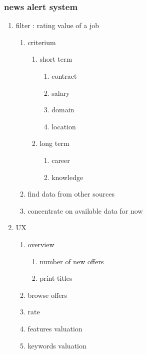 \documentclass[11pt]{article}
\begin{document}
\subsubsection{news alert system}
\label{sec:org2300e3e}
\begin{enumerate}
\item filter : rating value of a job
\label{sec:org435fa25}
\begin{enumerate}
\item criterium
\label{sec:orgd6d5d5d}
\begin{enumerate}
\item short term
\label{sec:org4d99756}
\begin{enumerate}
\item contract
\label{sec:org21076ce}
\item salary
\label{sec:org995e610}
\item domain
\label{sec:orgd6a03d5}
\item location
\label{sec:org88a73d3}
\end{enumerate}
\item long term
\label{sec:org33c08fc}
\begin{enumerate}
\item career
\label{sec:orgf8a2f07}
\item knowledge
\label{sec:org07172e5}
\end{enumerate}
\end{enumerate}
\item find data from other sources
\label{sec:org6dfcd8a}
\item concentrate on available data for now
\label{sec:org8b6e23e}
\end{enumerate}
\item UX
\label{sec:orgd7317db}
\begin{enumerate}
\item overview
\label{sec:orga1f6e55}
\begin{enumerate}
\item number of new offers
\label{sec:orgddc1631}
\item print titles
\label{sec:orgbdb13a3}
\end{enumerate}
\item browse offers
\label{sec:org942179d}
\item rate
\label{sec:org3e0ff62}
\item features valuation
\label{sec:org8b28d8b}
\item keywords valuation
\label{sec:orgd370e9f}
\begin{enumerate}

\end{enumerate}
\end{enumerate}
\end{enumerate}
\end{document}
